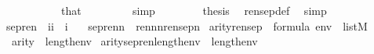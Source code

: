 \begin{isabellebody}
\ \ \ \ \ \ \ \ \ \ {\isacharbrackright}{\kern0pt}\ that\ \isanewline
\ \ \ \ \ \ \isamarkupfalse%
\ simp\isanewline
\ \ \isamarkupfalse%
\isanewline
\ \ \isamarkupfalse%
\ \isamarkupfalse%
\ {\isacharquery}{\kern0pt}thesis\ \isamarkupfalse%
\ rensep{\isacharunderscore}{\kern0pt}def\ \isamarkupfalse%
\ simp\isanewline
{}\isamarkupfalse%
%
\endisatagproof
{\isafoldproof}%
%
\isadelimproof
\isanewline
%
\endisadelimproof
\isanewline
{}\isamarkupfalse%
\ sep{\isacharunderscore}{\kern0pt}ren\ {\isacharcolon}{\kern0pt}{\isacharcolon}{\kern0pt}\ {\isachardoublequoteopen}{\isacharbrackleft}{\kern0pt}i{\isacharcomma}{\kern0pt}i{\isacharbrackright}{\kern0pt}\ {\isasymRightarrow}\ i{\isachardoublequoteclose}\ \isanewline
\ \ {\isachardoublequoteopen}sep{\isacharunderscore}{\kern0pt}ren{\isacharparenleft}{\kern0pt}n{\isacharcomma}{\kern0pt}{\isasymphi}{\isacharparenright}{\kern0pt}\ {\isasymequiv}\ ren{\isacharparenleft}{\kern0pt}{\isasymphi}{\isacharparenright}{\kern0pt}{\isacharbackquote}{\kern0pt}{\isacharparenleft}{\kern0pt}{}{\isacharhash}{\kern0pt}{\isacharplus}{\kern0pt}n{\isacharparenright}{\kern0pt}{\isacharbackquote}{\kern0pt}{\isacharparenleft}{\kern0pt}{}{\isacharhash}{\kern0pt}{\isacharplus}{\kern0pt}n{\isacharparenright}{\kern0pt}{\isacharbackquote}{\kern0pt}rensep{\isacharparenleft}{\kern0pt}n{\isacharparenright}{\kern0pt}{\isachardoublequoteclose}\isanewline
\isanewline
{}\isamarkupfalse%
\ arity{\isacharunderscore}{\kern0pt}rensep{\isacharcolon}{\kern0pt}\ \ {\isachardoublequoteopen}{\isasymphi}{\isasymin}formula{\isachardoublequoteclose}\ {\isachardoublequoteopen}env\ {\isasymin}\ list{\isacharparenleft}{\kern0pt}M{\isacharparenright}{\kern0pt}{\isachardoublequoteclose}\isanewline
\ \ {\isachardoublequoteopen}arity{\isacharparenleft}{\kern0pt}{\isasymphi}{\isacharparenright}{\kern0pt}\ {\isasymle}\ {}{\isacharhash}{\kern0pt}{\isacharplus}{\kern0pt}length{\isacharparenleft}{\kern0pt}env{\isacharparenright}{\kern0pt}{\isachardoublequoteclose}\isanewline
{}\ {\isachardoublequoteopen}arity{\isacharparenleft}{\kern0pt}sep{\isacharunderscore}{\kern0pt}ren{\isacharparenleft}{\kern0pt}length{\isacharparenleft}{\kern0pt}env{\isacharparenright}{\kern0pt}{\isacharcomma}{\kern0pt}{\isasymphi}{\isacharparenright}{\kern0pt}{\isacharparenright}{\kern0pt}\ {\isasymle}\ {}{\isacharhash}{\kern0pt}{\isacharplus}{\kern0pt}length{\isacharparenleft}{\kern0pt}env{\isacharparenright}{\kern0pt}{\isachardoublequoteclose}\isanewline

\end{isabellebody}
